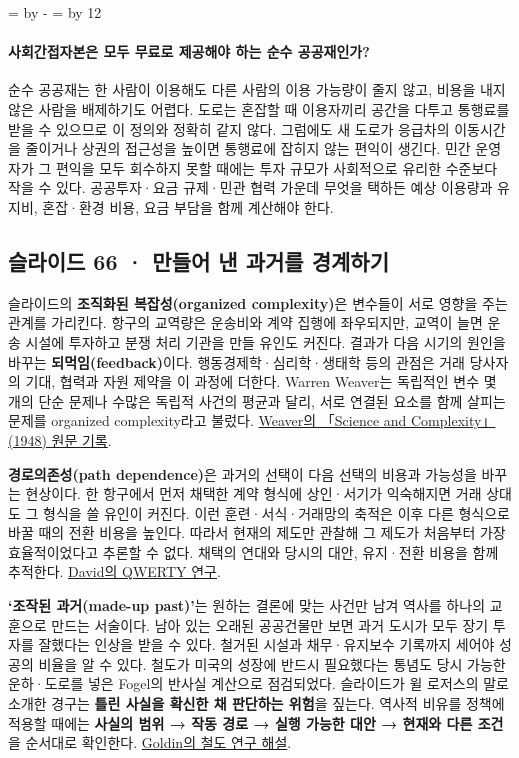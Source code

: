 \documentclass[10pt,a4paper]{article}
\newcommand{\ReserveQuestionSpace}{%
  \par\begingroup
  \dimen0=\pagegoal \advance\dimen0 by -\pagetotal
  \dimen2=\baselineskip \multiply\dimen2 by 12
  \ifdim\dimen0<\dimen2 \newpage\fi
  \endgroup}
\begin{document}
\ReserveQuestionSpace
\paragraph{사회간접자본은 모두 무료로 제공해야 하는 순수 공공재인가?}
순수 공공재는 한 사람이 이용해도 다른 사람의 이용 가능량이 줄지 않고, 비용을 내지 않은 사람을 배제하기도 어렵다. 도로는 혼잡할 때 이용자끼리 공간을 다투고 통행료를 받을 수 있으므로 이 정의와 정확히 같지 않다. 그럼에도 새 도로가 응급차의 이동시간을 줄이거나 상권의 접근성을 높이면 통행료에 잡히지 않는 편익이 생긴다. 민간 운영자가 그 편익을 모두 회수하지 못할 때에는 투자 규모가 사회적으로 유리한 수준보다 작을 수 있다. 공공투자·요금 규제·민관 협력 가운데 무엇을 택하든 예상 이용량과 유지비, 혼잡·환경 비용, 요금 부담을 함께 계산해야 한다.\par

\subsection{슬라이드 66 · 만들어 낸 과거를 경계하기}
슬라이드의 \textbf{조직화된 복잡성(organized complexity)}은 변수들이 서로 영향을 주는 관계를 가리킨다. 항구의 교역량은 운송비와 계약 집행에 좌우되지만, 교역이 늘면 운송 시설에 투자하고 분쟁 처리 기관을 만들 유인도 커진다. 결과가 다음 시기의 원인을 바꾸는 \textbf{되먹임(feedback)}이다. 행동경제학·심리학·생태학 등의 관점은 거래 당사자의 기대, 협력과 자원 제약을 이 과정에 더한다. Warren Weaver는 독립적인 변수 몇 개의 단순 문제나 수많은 독립적 사건의 평균과 달리, 서로 연결된 요소를 함께 살피는 문제를 organized complexity라고 불렀다. \href{https://repositorio.colmex.mx/concern/archival\_documents/0z709166h?locale=es}{Weaver의 「Science and Complexity」(1948) 원문 기록}.\par

\textbf{경로의존성(path dependence)}은 과거의 선택이 다음 선택의 비용과 가능성을 바꾸는 현상이다. 한 항구에서 먼저 채택한 계약 형식에 상인·서기가 익숙해지면 거래 상대도 그 형식을 쓸 유인이 커진다. 이런 훈련·서식·거래망의 축적은 이후 다른 형식으로 바꿀 때의 전환 비용을 높인다. 따라서 현재의 제도만 관찰해 그 제도가 처음부터 가장 효율적이었다고 추론할 수 없다. 채택의 연대와 당시의 대안, 유지·전환 비용을 함께 추적한다. \href{https://www.jstor.org/stable/1805621}{David의 QWERTY 연구}.\par

\textbf{‘조작된 과거(made-up past)’}는 원하는 결론에 맞는 사건만 남겨 역사를 하나의 교훈으로 만드는 서술이다. 남아 있는 오래된 공공건물만 보면 과거 도시가 모두 장기 투자를 잘했다는 인상을 받을 수 있다. 철거된 시설과 채무·유지보수 기록까지 세어야 성공의 비율을 알 수 있다. 철도가 미국의 성장에 반드시 필요했다는 통념도 당시 가능한 운하·도로를 넣은 Fogel의 반사실 계산으로 점검되었다. 슬라이드가 윌 로저스의 말로 소개한 경구는 \textbf{틀린 사실을 확신한 채 판단하는 위험}을 짚는다. 역사적 비유를 정책에 적용할 때에는 \textbf{사실의 범위 → 작동 경로 → 실행 가능한 대안 → 현재와 다른 조건}을 순서대로 확인한다. \href{https://goldin.scholars.harvard.edu/sites/g/files/omnuum5966/files/goldin/files/cliometrics.pdf}{Goldin의 철도 연구 해설}.\par
\end{document}
